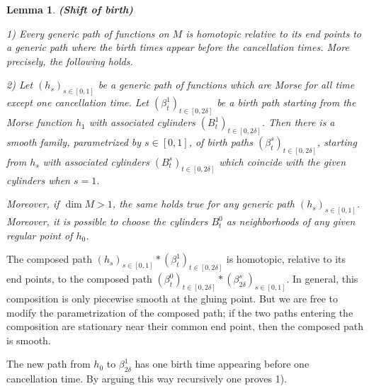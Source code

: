 \documentclass[12pt]{amsart}
\newtheorem{lemme}[thm]{Lemma}
\def\de{\delta}
\def\nd{\noindent}
\begin{document}

\begin{lemme}{\bf (Shift of birth)}\label{shift} ${}$

{\rm 1)} Every generic path of functions on $M$ is homotopic relative to its end points to a generic path
where the birth times appear before the cancellation times. More precisely, the following holds.

{\rm 2)} Let $\left(h_s\right)_{s\in [0,1]}$ be a generic path of functions which are Morse for all time except
one cancellation time.
Let $\left(\beta ^1_t\right)_{t\in[0,2\de]}$ be a birth path starting from the Morse function
$h_1$ with associated cylinders
$\left(B^1_t\right)_{t\in[0,2\de]}$. Then  there is a smooth family, parametrized by $s\in [0,1]$,
 of birth paths $\left(\beta^s_t\right)_{t\in[0,2\de]}$, starting  from $h_s$ %
  with  associated cylinders $\left(B^s_t\right)_{t\in[0,2\de]}$ which coincide with the given cylinders when 
 $s= 1$. 

Moreover, if %
  $\dim M>1$,  the same holds  true for  any generic path $\left(h_s\right)_{s\in [0,1]}$.
Moreover, it is possible to choose the cylinders $B^0_t$
as neighborhoods of any given regular 
point of $h_0$.
\end{lemme}



\nd {\bf Proof of 2)$\Rightarrow$1).} The composed  path $\left(h_s\right )_{s\in[0,1]}*\left(\beta^1_t\right)_{t\in[0,2\de]}$ is homotopic, relative to its end points, to the composed 
path  $\left(\beta^0_t\right)_{t\in[0,2\de]}*\left(\beta_{2\de}^s\right )_{s\in[0,1]}$. In general, this 
composition is only piecewise smooth at the gluing point.%
But we are free to modify the  parametrization of the composed path; if the two paths
entering the composition are stationary near their common end point, then the composed path is smooth.

The new path from $h_0$ to $\beta^1_{2\de}$ has one  birth time appearing before one cancellation time.
By arguing this way recursively  one proves 1).\\
\end{document}
